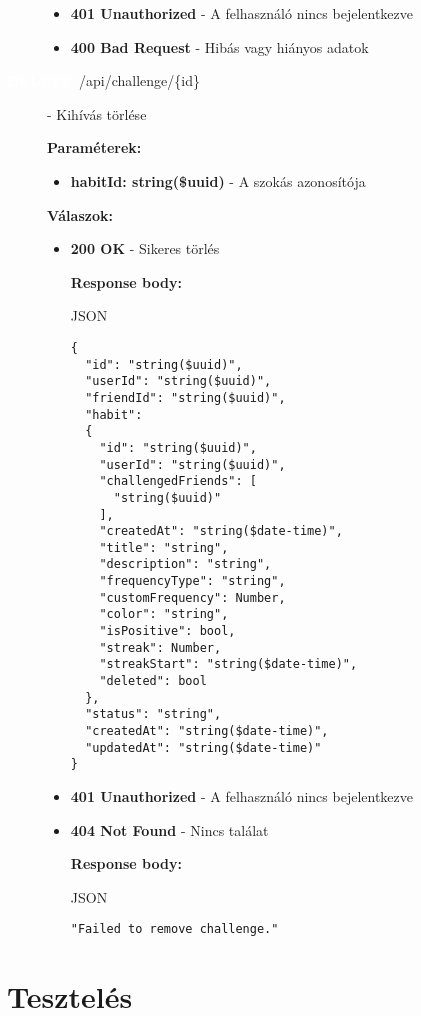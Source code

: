 \documentclass[12pt]{report}
\newcommand{\httpDelete}[1]{\colorbox{deleteColor}{\textbf{\textcolor{white}{DELETE}}}~#1}
\begin{document}
\begin{description}
\begin{itemize}
      \item \textbf{401 Unauthorized} - A felhasználó nincs bejelentkezve

      \item \textbf{400 Bad Request} - Hibás vagy hiányos adatok

    \end{itemize}

  \item[\httpDelete{/api/challenge/\{id\}}] - Kihívás törlése
  
    \vspace{0.5cm}
    \textbf{Paraméterek:}
    \begin{itemize}
      \item \textbf{habitId: string(\$uuid)} - A szokás azonosítója
    \end{itemize}

    \vspace{0.5cm}
    \textbf{Válaszok:}
    \begin{itemize}
      \item \textbf{200 OK} - Sikeres törlés

        \textbf{Response body:}
        \begin{codeblock}{JSON}
          \begin{verbatim}
{
  "id": "string($uuid)",
  "userId": "string($uuid)",
  "friendId": "string($uuid)",
  "habit": 
  {
    "id": "string($uuid)",
    "userId": "string($uuid)",
    "challengedFriends": [
      "string($uuid)"
    ],
    "createdAt": "string($date-time)",
    "title": "string",
    "description": "string",
    "frequencyType": "string",
    "customFrequency": Number,
    "color": "string",
    "isPositive": bool,
    "streak": Number,
    "streakStart": "string($date-time)",
    "deleted": bool
  },
  "status": "string",
  "createdAt": "string($date-time)",
  "updatedAt": "string($date-time)"
}
          \end{verbatim}
        \end{codeblock}

      \item \textbf{401 Unauthorized} - A felhasználó nincs bejelentkezve

      \item \textbf{404 Not Found} - Nincs találat

        \textbf{Response body:}
        \begin{codeblock}{JSON}
          \begin{verbatim}
"Failed to remove challenge."
          \end{verbatim}
        \end{codeblock}
    \end{itemize}

\end{description}

\chapter{Tesztelés}
\end{document}
